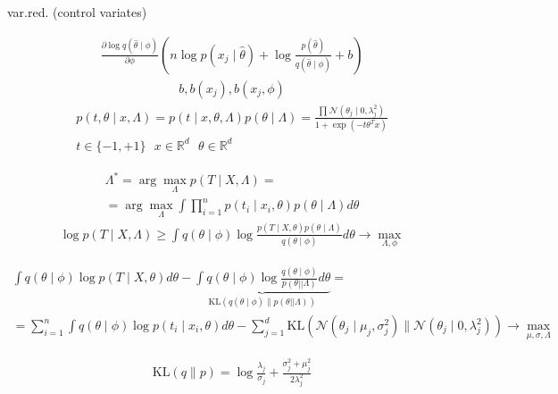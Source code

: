 \documentclass{book}
\begin{document}
var.red. (control variates)

\begin{gather*}
    \frac{\partial \log q(\hat{\theta}\mid \phi)}{\partial \phi}\left(n\log p(x_j\mid \hat{\theta})+\log\frac{p(\hat{\theta})}{q(\hat{\theta}\mid \phi)}+b\right)
\end{gather*}
\begin{gather*}
    b, b(x_j), b(x_j,\phi)
\end{gather*}
\begin{gather*}
    p(t,\theta\mid x,\Lambda)=p(t\mid x,\theta,\Lambda)p(\theta\mid \Lambda)=\frac{\prod_{}^{} {\mathcal{N}(\theta_j\mid 0,\lambda_j^2)}}{1+\exp(-t\theta^Tx)}\\
    t\in\{-1,+1\}~~~x\in \mathbb{R}^d~~~\theta\in\mathbb{R}^d
\end{gather*}

\begin{gather*}
    \Lambda^*=\arg\max_\Lambda p(T\mid X,\Lambda)=\\
    =\arg\max_\Lambda \int {\prod_{i=1}^{n} {p(t_i\mid x_i,\theta)p(\theta\mid \Lambda)}d\theta}
\end{gather*}
\begin{gather*}
    \log p(T\mid X,\Lambda)\geq \int {q(\theta\mid \phi)\log\frac{p(T\mid X,\theta)p(\theta\mid \Lambda)}{q(\theta\mid \phi)}d\theta}\rightarrow\max_{\Lambda,\phi}
\end{gather*}

\begin{gather*}
    \int {q(\theta\mid \phi)\log p(T\mid X,\theta)d\theta}-\underbrace{\int {q(\theta\mid \phi)\log\frac{q(\theta\mid \phi)}{p(\theta||\Lambda)}d\theta}}_{\mathrm{KL}(q(\theta\mid \phi)\|p(\theta||\Lambda))}=\\
    =\sum_{i=1}^{n} {\int {q(\theta\mid \phi)\log p(t_i\mid x_i,\theta)d\theta}}-\sum_{j=1}^{d} {\mathrm{KL}(\mathcal{N}(\theta_j\mid \mu_j,\sigma_j^2)\|\mathcal{N}(\theta_j\mid 0,\lambda_j^2))}\rightarrow\max_{\mu,\sigma,\Lambda}
\end{gather*}

\begin{gather*}
    \mathrm{KL}(q\|p)=\log\frac{\lambda_j}{\sigma_j}+\frac{\sigma_j^2+\mu_j^2}{2\lambda_j^2}
\end{gather*}
\end{document}
